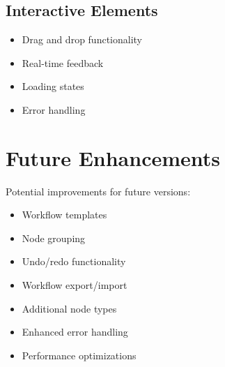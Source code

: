\documentclass{article}
\begin{document}
\subsection{Interactive Elements}
\begin{itemize}
    \item Drag and drop functionality
    \item Real-time feedback
    \item Loading states
    \item Error handling
\end{itemize}

\section{Future Enhancements}
Potential improvements for future versions:
\begin{itemize}
    \item Workflow templates
    \item Node grouping
    \item Undo/redo functionality
    \item Workflow export/import
    \item Additional node types
    \item Enhanced error handling
    \item Performance optimizations
\end{itemize}
\end{document}
